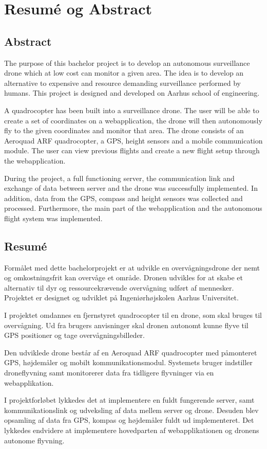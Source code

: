 \chapter{Resumé og Abstract}
\label{chap:resume}


\section*{Abstract}

The purpose of this bachelor project is to develop an autonomous surveillance drone which at low cost can monitor a given area. The idea is to develop an alternative to expensive and resource demanding surveillance performed by humans. This project is designed and developed on Aarhus school of engineering. 

A quadrocopter has been built into a surveillance drone. The user will be able to create a set of coordinates on a webapplication, the drone will then autonomously fly to the given coordinates and monitor that area. 
The drone consists of an Aeroquad ARF quadrocopter, a GPS, height sensors and a mobile communication module. 
The user can view previous flights and create a new flight setup through the webapplication.

During the project, a full functioning server, the communication link and exchange of data between server and the drone was successfully implemented. In addition, data from the GPS, compass and height sensors was collected and processed. Furthermore, the main part of the webapplication and the autonomous flight system was implemented.




\section*{Resumé}

Formålet med dette bachelorprojekt er at udvikle en overvågningsdrone der nemt og omkostningsfrit kan overvåge et område. Dronen udvikles for at skabe et alternativ til dyr og ressourcekrævende overvågning udført af mennesker.
Projektet er designet og udviklet på Ingeniørhøjskolen Aarhus Universitet.

I projektet omdannes en fjernstyret quadrocopter til en drone, som skal bruges til overvågning. Ud fra brugers anvisninger skal dronen autonomt kunne flyve til GPS positioner og tage overvågningsbilleder.  

Den udviklede drone består af en Aeroquad ARF quadrocopter med påmonteret GPS, højdemåler og mobilt kommunikationsmodul. Systemets bruger indstiller droneflyvning samt monitorerer data fra tidligere flyvninger via en webapplikation.  

I projektforløbet lykkedes det at implementere en fuldt fungerende server, samt kommunikationslink og udveksling af data mellem server og drone. Desuden blev opsamling af data fra GPS, kompas og højdemåler fuldt ud implementeret. Det lykkedes endvidere at implementere hovedparten af webapplikationen og dronens autonome flyvning.





